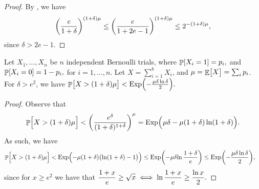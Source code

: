 \begin{proof}
    By , we have
    \begin{align*}
      \pth{\frac{e}{1+\delta}}^{(1+\delta)\mu}%
      \leq%
      \pth{\frac{e}{1+2e - 1}}^{(1+\delta)\mu}%
      \leq%
      2^{-(1+\delta)\mu},
    \end{align*}
    since $\delta > 2e - 1$.
\end{proof}

\begin{lemma}
    Let $X_1, \ldots, X_n$ be $n$ independent Bernoulli trials, where
    \begin{math}
        \Prob{  X_i = 1 } =p_i,
    \end{math}
    and 
    \begin{math}
        \Prob{  X_i = 0 } =1- p_i,
    \end{math}
    for $i=1,\ldots, n$.  Let $X = \sum_{i=1}^{b} X_i$, and
    $\mu = \mathop{\mathbb{E}}\!\left[ {\bigl. X} \right] = \sum_i p_i$.  For $\delta > e^2$, we have
    \begin{math}
        \Prob{ \bigl. X > (1+\delta)\mu }%
        <%
        \Exp \pth{ \Bigl. - \frac{\mu \delta \ln \delta}{2}}.%
    \end{math}
\end{lemma}
\begin{proof}
    Observe that
    \begin{align}
        \Prob{\Bigl. X > (1+\delta)\mu }%
        <%
        \pth{ \frac{e^\delta}{(1+\delta)^{1+\delta}}}^\mu%
        =%
        \Exp \pth{ \Bigl.\ts \mu \delta - \mu\pth{1+\delta}\ln \pth{
              1+\delta}}.%
        \eqlab{c:imply}%
    \end{align}
    As such, we have
    \begin{align*}
        \Prob{\Bigl. X > (1+\delta)\mu }%
        &<%
        \Exp \pth{ \Bigl. - \mu\pth{1+\delta} \pth{ \bigl. \ln \pth{
                 1+\delta} - 1 }}%
        \leq %
        \Exp \pth{ \Bigl. - \mu \delta { \bigl. \ln {
                 \frac{1+\delta}{e}} }}%
        \leq %
        \Exp \pth{ \Bigl. - \frac{\mu \delta \ln \delta}{2}},
    \end{align*}
    since for $x \geq e^2$ we have that
    \begin{math}
        \ds%
        \frac{1+x}{e} \geq \sqrt{x} \iff%
        \ln \frac{1+x}{e} \geq \frac{\ln{x}}{2}.
    \end{math}
\end{proof}


